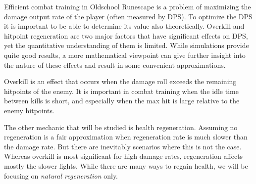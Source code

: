 Efficient combat training in Oldschool Runescape is a problem of maximizing the damage output rate of the player (often measured by DPS). To optimize the DPS it is important to be able to determine its value also theoretically. Overkill and hitpoint regeneration are two major factors that have significant effects on DPS, yet the quantitative understanding of them is limited.
While simulations provide quite good results, a more mathematical viewpoint can give further insight into the nature of these effects and result in some convenient approximations.

Overkill is an effect that occurs when the damage roll exceeds the remaining hitpoints of the enemy. It is important in combat training when the idle time between kills is short, and especially when the max hit is large relative to the enemy hitpoints.

The other mechanic that will be studied is health regeneration. Assuming no regeneration is a fair approximation when regeneration rate is much slower than the damage rate. But there are inevitably scenarios where this is not the case. Whereas overkill is most significant for high damage rates, regeneration affects mostly the slower fights. While there are many ways to regain health, we will be focusing on \textit{natural regeneration} only.
